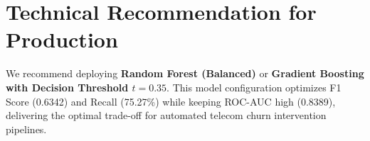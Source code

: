 \documentclass[11pt,a4paper]{article}
\begin{document}
\section{Technical Recommendation for Production}
We recommend deploying \textbf{Random Forest (Balanced)} or \textbf{Gradient Boosting with Decision Threshold $t=0.35$}. This model configuration optimizes F1 Score (0.6342) and Recall (75.27\%) while keeping ROC-AUC high (0.8389), delivering the optimal trade-off for automated telecom churn intervention pipelines.
\end{document}
